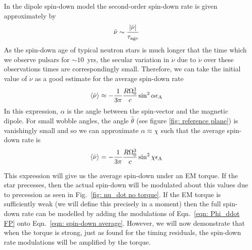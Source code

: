 \documentclass[../full_thesis/full_thesis.tex]{subfiles}
\begin{document}
In the dipole spin-down model the second-order spin-down rate is given
approximately by
\begin{align}
\ddot{\nu} \sim \frac{|\dot{\nu}|}{\tau_{\mathrm{age}}}
\end{align}
As the spin-down age of typical neutron stars is much longer that the time
which we observe pulsars for $\sim 10$~yrs, the secular variation in
$\dot{\nu}$ due to $\ddot{\nu}$ over these observations times are
correspondingly small. Therefore, we can take the initial value of $\dot{\nu}$
as a good estimate for the average spin-down rate
\begin{align}
\langle\dot{\nu}\rangle \approx -\frac{1}{3\pi}\frac{R \Omega_{0}^{3}}{c} \sin^{2}\alpha \epsilon_{\mathrm{A}}
\label{eqn: spin-down initial EM}
\end{align}
In this expression, $\alpha$ is the angle between the spin-vector and the
magnetic dipole. For small wobble angles, the angle $\hat{\theta}$ (see figure
\ref{fig: reference plane}) is vanishingly small and so we can approximate
$\alpha \approx \chi$ such that the average spin-down rate is
\begin{equation}
    \langle \dot{\nu}\rangle = -\frac{1}{3\pi}\frac{R \Omega_{0}^{3}}{c} \sin^{2}\chi \epsilon_{\mathrm{A}}
    \label{eqn: spin-down average}
\end{equation}

This expression will give us the average spin-down under an EM torque. If the
star precesses, then the actual spin-down will be modulated about this values
due to precession as seen in Fig.~\ref{fig: nu_dot no torque}. If the EM torque
is sufficiently weak (we will define this precisely in a moment) then the full
spin-down rate can be modelled by adding the modulations of Eqn.~\eqref{eqn: Phi_ddot FP}
onto Eqn.~\eqref{eqn: spin-down average}. However, we will now demonstrate that when
the torque is strong, just as \citet{Jones2001} found for the timing residuals,
the spin-down rate modulations will be amplified by the torque.
\end{document}
